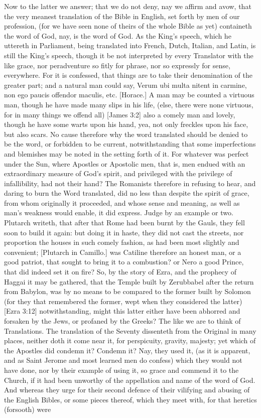 {\par }{\IP Now to the latter we answer; that we do not deny, nay we affirm and avow, that the very meanest translation of the Bible in English, set forth by men of our profession, (for we have seen none of theirs of the whole Bible as yet) containeth the word of God, nay, is the word of God. As the King’s speech, which he uttereth in Parliament, being translated into French, Dutch, Italian, and Latin, is still the King’s speech, though it be not interpreted by every Translator with the like grace, nor peradventure so fitly for phrase, nor so expressly for sense, everywhere. For it is confessed, that things are to take their denomination of the greater part; and a natural man could say, Verum ubi multa nitent in carmine, non ego paucis offendor maculis, etc. [Horace.] A man may be counted a virtuous man, though he have made many slips in his life, (else, there were none virtuous, for in many things we offend all) [James 3:2] also a comely man and lovely, though he have some warts upon his hand, yea, not only freckles upon his face, but also scars. No cause therefore why the word translated should be denied to be the word, or forbidden to be current, notwithstanding that some imperfections and blemishes may be noted in the setting forth of it. For whatever was perfect under the Sun, where Apostles or Apostolic men, that is, men endued with an extraordinary measure of God’s spirit, and privileged with the privilege of infallibility, had not their hand? The Romanists therefore in refusing to hear, and daring to burn the Word translated, did no less than despite the spirit of grace, from whom originally it proceeded, and whose sense and meaning, as well as man’s weakness would enable, it did express. Judge by an example or two. Plutarch writeth, that after that Rome had been burnt by the Gauls, they fell soon to build it again: but doing it in haste, they did not cast the streets, nor proportion the houses in such comely fashion, as had been most slightly and convenient; [Plutarch in Camillo.] was Catiline therefore an honest man, or a good patriot, that sought to bring it to a combustion? or Nero a good Prince, that did indeed set it on fire? So, by the story of Ezra, and the prophecy of Haggai it may be gathered, that the Temple built by Zerubbabel after the return from Babylon, was by no means to be compared to the former built by Solomon (for they that remembered the former, wept when they considered the latter) [Ezra 3:12] notwithstanding, might this latter either have been abhorred and forsaken by the Jews, or profaned by the Greeks? The like we are to think of Translations. The translation of the Seventy dissenteth from the Original in many places, neither doth it come near it, for perspicuity, gravity, majesty; yet which of the Apostles did condemn it? Condemn it? Nay, they used it, (as it is apparent, and as Saint Jerome and most learned men do confess) which they would not have done, nor by their example of using it, so grace and commend it to the Church, if it had been unworthy of the appellation and name of the word of God. And whereas they urge for their second defence of their vilifying and abusing of the English Bibles, or some pieces thereof, which they meet with, for that heretics (forsooth) were }
